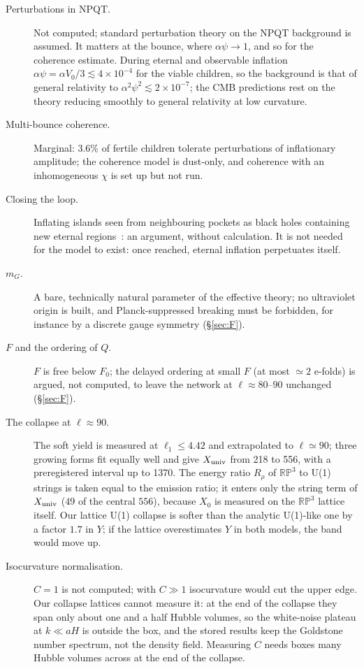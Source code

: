 \documentclass[11pt,a4paper]{article}
\newcommand{\RP}{\mathbb{RP}^3}
\newcommand{\Xu}{X_{\rm univ}}
\begin{document}
\begin{description}
\item[Perturbations in NPQT.] Not computed; standard perturbation theory on the NPQT background is assumed. It matters at the bounce, where $\alpha\psi\to1$, and so for the coherence estimate. During eternal and observable inflation $\alpha\psi=\alpha V_0/3\lesssim4\times10^{-4}$ for the viable children, so the background is that of general relativity to $\alpha^2\psi^2\lesssim2\times10^{-7}$; the CMB predictions rest on the theory reducing smoothly to general relativity at low curvature.
\item[Multi-bounce coherence.] Marginal: $3.6\%$ of fertile children tolerate perturbations of inflationary amplitude; the coherence model is dust-only, and coherence with an inhomogeneous $\chi$ is set up but not run.
\item[Closing the loop.] Inflating islands seen from neighbouring pockets as black holes containing new eternal regions~\cite{GVZ2016}: an argument, without calculation. It is not needed for the model to exist: once reached, eternal inflation perpetuates itself.
\item[$m_G$.] A bare, technically natural parameter of the effective theory; no ultraviolet origin is built, and Planck-suppressed breaking must be forbidden, for instance by a discrete gauge symmetry (\S\ref{sec:F}).
\item[$F$ and the ordering of $Q$.] $F$ is free below $F_0$; the delayed ordering at small $F$ (at most $\simeq2$ e-folds) is argued, not computed, to leave the network at $\ell\approx80$--$90$ unchanged (\S\ref{sec:F}).
\item[The collapse at $\ell\approx90$.] The soft yield is measured at $\ell_1\le4.42$ and extrapolated to $\ell\simeq90$; three growing forms fit equally well and give $\Xu$ from 218 to 556, with a preregistered interval up to 1370. The energy ratio $R_\rho$ of $\RP$ to U(1) strings is taken equal to the emission ratio; it enters only the string term of $\Xu$ ($49$ of the central $556$), because $X_0$ is measured on the $\RP$ lattice itself. Our lattice U(1) collapse is softer than the analytic U(1)-like one by a factor $1.7$ in $Y$; if the lattice overestimates $Y$ in both models, the band would move up.
\item[Isocurvature normalisation.] $C=1$ is not computed; with $C\gg1$ isocurvature would cut the upper edge. Our collapse lattices cannot measure it: at the end of the collapse they span only about one and a half Hubble volumes, so the white-noise plateau at $k\ll aH$ is outside the box, and the stored results keep the Goldstone number spectrum, not the density field. Measuring $C$ needs boxes many Hubble volumes across at the end of the collapse.

\end{description}
\end{document}
